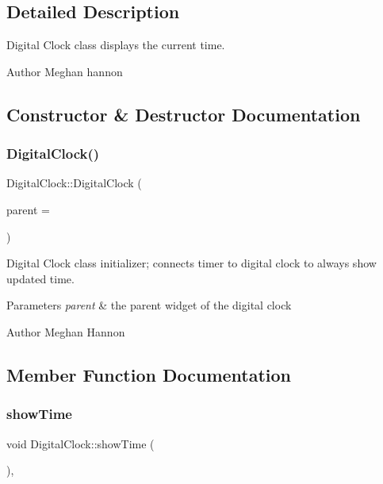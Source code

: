 \subsection{Detailed Description}
Digital Clock class displays the current time. 

\begin{DoxyAuthor}{Author}
Meghan hannon 
\end{DoxyAuthor}


\subsection{Constructor \& Destructor Documentation}
\mbox{\label{class_digital_clock_a1df69f177d5defdd5029ff2e6b7cb564}} 
\subsubsection{\texorpdfstring{Digital\+Clock()}{DigitalClock()}}
{\footnotesize\ttfamily Digital\+Clock\+::\+Digital\+Clock (\begin{DoxyParamCaption}\item[{Q\+Widget $\ast$}]{parent = {} }\end{DoxyParamCaption})}



Digital Clock class initializer; connects timer to digital clock to always show updated time. 


\begin{DoxyParams}{Parameters}
{\em parent} & the parent widget of the digital clock \\
\hline
\end{DoxyParams}
\begin{DoxyAuthor}{Author}
Meghan Hannon 
\end{DoxyAuthor}


\subsection{Member Function Documentation}
\mbox{\label{class_digital_clock_a87cd1f935265a947f2ece712bffc4aaa}} 
\subsubsection{\texorpdfstring{show\+Time}{showTime}}
{\footnotesize\ttfamily void Digital\+Clock\+::show\+Time (\begin{DoxyParamCaption}{ }\end{DoxyParamCaption})\hspace{0.3cm}{\ttfamily [private]}, {\ttfamily [slot]}}



